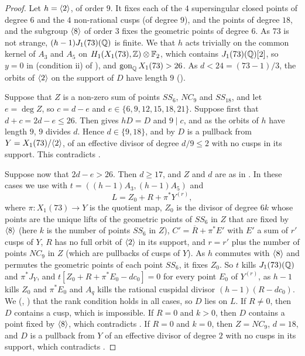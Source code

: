 \begin{proof}
Let $h=\langle 2\rangle$, of order $9$. It fixes each of the $4$ supersingular closed points of degree $6$ and the $4$ non-rational cusps (of degree $9$), and the points of degree $18$, and the subgroup $\langle 8\rangle$ of order $3$ fixes the geometric points of degree $6$. As $73$ is not strange, $(h-1)J_1(73)(\mathbb{Q})$ is finite. We  that $h$ acts trivially on the common kernel of $A_3$ and $A_5$ on $H_1(X_1(73),\mathbb{Z})\otimes\mathbb{F}_2$, which contains $J_1(73)(\mathbb{Q})[2]$, so $y=0$ in  (condition ii) of ), and $\operatorname{gon}_{\mathbb{Q}} X_1(73)>26$. As $d<24=(73-1)/3$, the orbits of $\langle 2\rangle$ on the support of $D$ have length $9$ ().

Suppose that $Z$ is a non-zero sum of points $SS_6$, $NC_9$ and $SS_{18}$, and let $e=\deg Z$, so $c=d-e$ and $e\in\{6,9,12,15,18,21\}$. Suppose first that $d+c=2d-e\leq 26$. Then  gives $hD=D$ and $9\mid c$, and as the orbits of $h$ have length $9$, $9$ divides $d$. Hence $d\in\{9,18\}$, and by  $D$ is a pullback from $Y=X_1(73)/\langle 2\rangle$, of an effective divisor of degree $d/9\leq2$ with no cusps in its support. This contradicts .

Suppose now that $2d-e>26$. Then $d\geq 17$, and $Z$ and $d$ are as in . In these cases we use  with $t=((h-1)A_3,(h-1)A_5)$ and
$$L=Z_0+R+\pi^*Y^{(r)},$$
where $\pi:X_1(73)\to Y$ is the quotient map, $Z_0$ is the divisor of degree $6k$ whose points are the unique lifts of the geometric points of $SS_6$ in $Z$ that are fixed by $\langle 8\rangle$ (here $k$ is the number of points $SS_6$ in $Z$), $C'=\overline{R}+\pi^*E'$ with $E'$ a sum of $r'$ cusps of $Y$, $R$ has no full orbit of $\langle 2\rangle$ in its support, and $r=r'$ plus the number of points $NC_9$ in $Z$ (which are pullbacks of cusps of $Y$). As $h$ commutes with $\langle 8\rangle$ and permutes the geometric points of each point $SS_6$, it fixes $Z_0$. So $t$ kills $J_1(73)(\mathbb{Q})$ and $\pi^*J_Y$, and $t[Z_0+R+\pi^*E_0-dc_0]=0$ for every point $E_0$ of $Y^{(r)}$, as $h-1$ kills $Z_0$ and $\pi^*E_0$ and $A_q$ kills the rational cuspidal divisor $(h-1)(R-dc_0)$. We  (, ) that the rank condition holds in all cases, so $D$ lies on $L$. If $R\neq0$, then $D$ contains a cusp, which is impossible. If $R=0$ and $k>0$, then $D$ contains a point fixed by $\langle 8\rangle$, which contradicts . If $R=0$ and $k=0$, then $Z=NC_9$, $d=18$, and $D$ is a pullback from $Y$ of an effective divisor of degree $2$ with no cusps in its support, which contradicts .
\end{proof}

